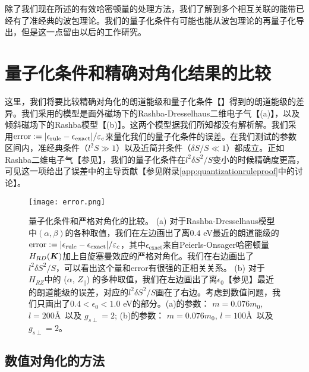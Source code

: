 除了我们现在所述的有效哈密顿量的处理方法，我们了解到多个相互关联的能带\cite{culcer_coherent_2005}已经有了准经典的波包理论。我们的量子化条件有可能也能从波包理论的再量子化导出\cite{xiao_berry_2010}，但是这一点留由以后的工作研究。

\chapter{量子化条件和精确对角化结果的比较}\label{app:approximatevsexact}

这里，我们将要比较精确对角化的朗道能级和量子化条件【】得到的朗道能级的差异。我们采用的模型是面外磁场下的Rashba-Dresselhaus二维电子气【(a)】，以及倾斜磁场下的Rashba模型【(b)】。这两个模型据我们所知都没有解析解。我们采用$\text{error}:=|\epsilon_\text{rule}-\epsilon_\text{exact}|/\varepsilon_c$来量化我们的量子化条件的误差。在我们测试的参数区间内，准经典条件（$l^2 S\gg 1$）以及近简并条件（$\delta S/S\ll 1$）都成立。正如Rashba二维电子气【参见】，我们的量子化条件在$l^2\delta S^2/S$变小的时候精确度更高，可见这一项给出了误差中的主导贡献【参见附录\ref{app:quantizationruleproof}中的讨论】。


\begin{figure}
\texttt{[image: error.png]}
\caption{{量子化条件和严格对角化的比较。 (a) 对于Rashba-Dresselhaus模型中$(\alpha,\beta)$的各种取值，我们在左边画出了离$0.4$ eV最近的朗道能级的$\text{error}:=|\epsilon_\text{rule}-\epsilon_\text{exact}|/\varepsilon_c$，其中$\epsilon_{\text{exact}}$来自Peierls-Onsager哈密顿量$H_{RD}(\boldsymbol{K})$加上自旋塞曼效应的严格对角化。我们在右边画出了$l^2\delta S^2/S$，可以看出这个量和$\text{error}$有很强的正相关关系。 (b) 对于$H_{RZ}$中的 ($\alpha$, $Z_\parallel$) 的多种取值，我们在左边画出了离$\epsilon_0$【参见】最近的朗道能级的误差，对应的$l^2 \delta S^2/S$画在了右边。考虑到数值问题，我们只画出了$0.4{<}\epsilon_0{<}1.0$ eV的部分。(a)的参数： $m=0.076m_0$, $l=200$\AA~以及 $g_{s\perp}=2$; (b)的参数： $m=0.076m_0$, $l=100$\AA~以及 $g_{s\perp}=2$。}\label{fig:error}}
\end{figure}


\section{数值对角化的方法}\label{sec:numerical}

